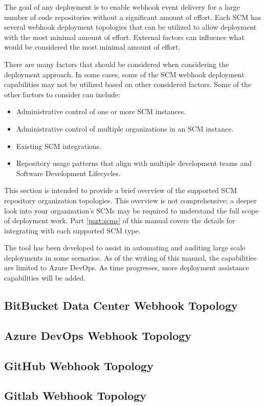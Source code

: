 The goal of any \cxoneflow deployment is to enable webhook event delivery for a
large number of code repositories without a significant amount of effort.  Each 
SCM has several webhook deployment topologies that can be utilized to allow
deployment with the most minimal amount of effort. External factors can influence
what would be considered the most minimal amount of effort.

There are many factors that should be considered when considering the deployment
approach.  In some cases, some of the SCM webhook deployment capabilities may
not be utilized based on other considered factors.  Some of the
other factors to consider can include:

\begin{itemize}
    \item Administrative control of one or more SCM instances.
    \item Administrative control of multiple organizations in an SCM instance.
    \item Existing SCM integrations.
    \item Repository usage patterns that align with multiple development teams and Software Development Lifecycles.
\end{itemize}

This section is intended to provide a brief overview of the supported SCM repository organization topologies.
This overview is not comprehensive; a deeper look into your organization's SCMs may be required
to understand the full scope of deployment work. Part \ref{part:scms} of this manual covers the
details for integrating \cxoneflow with each supported SCM type.

The tool  has been
developed to assist in automating and auditing large scale deployments in some scenarios.  As
of the writing of this manual, the capabilities are limited to Azure DevOps.  As time progresses,
more deployment assistance capabilities will be added.


\subsection{BitBucket Data Center Webhook Topology}



\subsection{Azure DevOps Webhook Topology}



\subsection{GitHub Webhook Topology}



\subsection{Gitlab Webhook Topology}



